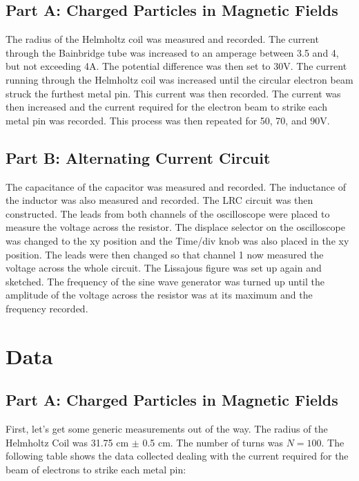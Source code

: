\documentclass[titlepage]{article}
\begin{document}
\subsection{Part A: Charged Particles in Magnetic Fields}\label{sub:part_a_charged_particles_in_magnetic_fields-proc}
The radius of the Helmholtz coil was measured and recorded. The current through the Bainbridge tube was increased to an amperage between 3.5 and 4, but not exceeding 4A. The potential difference was then set to 30V. The current running through the Helmholtz coil was increased until the circular electron beam struck the furthest metal pin. This current was then recorded. The current was then increased and the current required for the electron beam to strike each metal pin was recorded. This process was then repeated for 50, 70, and 90V.

\subsection{Part B: Alternating Current Circuit}\label{sub:part_b_alternating_current_circuit-proc}
The capacitance of the capacitor was measured and recorded. The inductance of the inductor was also measured and recorded. The LRC circuit was then constructed. The leads from both channels of the oscilloscope were placed to measure the voltage across the resistor. The displace selector on the oscilloscope was changed to the x­y position and the Time/div knob was also placed in the x­y position. The leads were then changed so that channel 1 now measured the voltage across the whole circuit. The Lissajous figure was set up again and sketched. The frequency of the sine wave generator was turned up until the amplitude of the voltage across the resistor was at its maximum and the frequency recorded.

\section{Data}\label{sec:data}
\subsection{Part A: Charged Particles in Magnetic Fields}\label{sub:part_a_charged_particles_in_magnetic_fields-data}
First, let's get some generic measurements out of the way. The radius of the Helmholtz Coil was 31.75 cm $\pm$ 0.5 cm. The number of turns was $N = 100$. The following table shows the data collected dealing with the current required for the beam of electrons to strike each metal pin:
\end{document}
